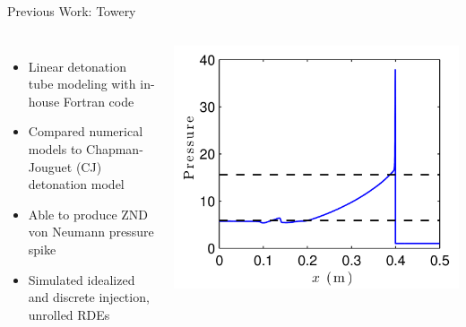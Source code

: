 \begin{frame}{Previous Work: Towery \cite{towery1}}
\begin{columns}
\begin{itemize}
\item Linear detonation tube modeling with in-house Fortran code
\item Compared numerical models to Chapman-Jouguet \cite{chapman} (CJ) detonation model
\item Able to produce ZND von Neumann pressure spike \cite{zeldovich,neumann,doring}
\item Simulated idealized and discrete injection, unrolled RDEs 
\end{itemize}
\begin{center}
\includegraphics[width=\textwidth]{../figs/towery/pressure.png}    
\end{center}
\end{columns}    
\end{frame}

%


